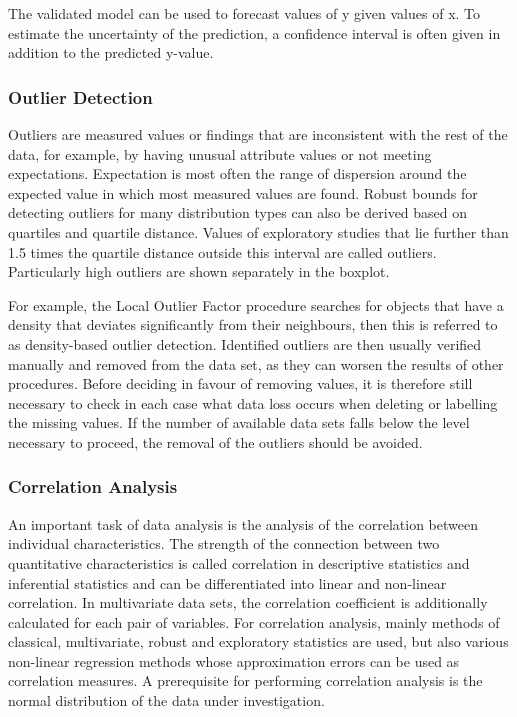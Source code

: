 \bigskip
The validated model can be used to forecast values of y given values of x. To estimate the uncertainty of the prediction, a confidence interval is often given in addition to the predicted y-value.


\subsubsection{Outlier Detection}

Outliers are measured values or findings that are inconsistent with the rest of the data, for example, by having unusual attribute values or not meeting expectations. Expectation is most often the range of dispersion around the expected value in which most measured values are found. \glqq Robust bounds for detecting outliers for many distribution types can also be derived based on quartiles and quartile distance.\grqq \cite{Sachs.2006} Values of exploratory studies that lie further than 1.5 times the quartile distance outside this interval are called outliers. Particularly high outliers are shown separately in the boxplot.

For example, the Local Outlier Factor procedure searches for objects that have a density that deviates significantly from their neighbours, then this is referred to as density-based outlier detection. Identified outliers are then usually verified manually and removed from the data set, as they can worsen the results of other procedures. Before deciding in favour of removing values, it is therefore still necessary to check in each case what data loss occurs when deleting or labelling the missing values. If the number of available data sets falls below the level necessary to proceed, the removal of the outliers should be avoided.

	
\subsubsection{Correlation Analysis}

An important task of data analysis is the analysis of the correlation between individual characteristics. The strength of the connection between two quantitative characteristics is called correlation in descriptive statistics and inferential statistics and can be differentiated into linear and non-linear correlation. In multivariate data sets, the correlation coefficient is additionally calculated for each pair of variables.\cite{Goettingen} \glqq For correlation analysis, mainly methods of classical, multivariate, robust and exploratory statistics are used, but also various non-linear regression methods whose approximation errors can be used as correlation measures.\grqq \cite{Runkler.2015} A prerequisite for performing correlation analysis is the normal distribution of the data under investigation.

